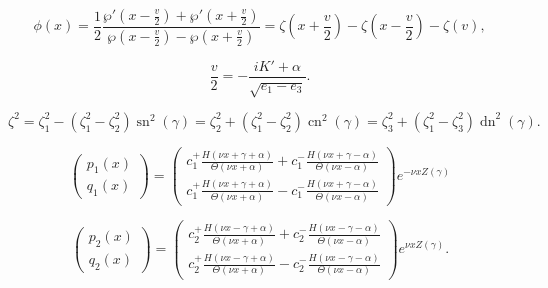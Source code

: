 \documentclass[10pt,a4paper]{amsart}
\DeclareMathOperator{\cn}{cn}
\DeclareMathOperator{\dn}{dn}
\DeclareMathOperator{\sn}{sn}
\begin{document}
\begin{equation}
\label{phinova}
\phi(x) = \frac{1}{2}\frac{\wp'(x-\frac{v}{2})+\wp'(x+\frac{v}{2})}{\wp(x-\frac{v}{2})-\wp(x + \frac{v}{2})} = \zeta\left(x+\frac{v}{2}\right)-\zeta\left(x-\frac{v}{2}\right)-\zeta(v),
\end{equation}

\begin{equation}
\label{v-alpha-correspondence}
\frac{v}{2} = -\frac{iK' + \alpha}{\sqrt{e_1-e_3}}.
\end{equation}

	\begin{equation}
	\label{Lame-disp}
	\zeta^2 = \zeta_1^2 - (\zeta_1^2 - \zeta_2^2) \sn^2(\gamma) = 
	\zeta_2^2 + (\zeta_1^2 - \zeta_2^2) \cn^2(\gamma) = 
	\zeta_3^2 + (\zeta_1^2 - \zeta_3^2) \dn^2(\gamma).
	\end{equation}

\begin{equation}
\label{Lame-sol-1}
\left( \begin{matrix} p_1(x) \\ q_1(x) \end{matrix} \right) = 
\left( \begin{matrix} 
c_1^+ \frac{ H(\nu x + \gamma + \alpha)}{\Theta(\nu x + \alpha)} + c_1^- \frac{H(\nu x + \gamma - \alpha)}{\Theta(\nu x - \alpha)} \\
c_1^+ \frac{ H(\nu x + \gamma + \alpha)}{\Theta(\nu x + \alpha)} - c_1^- \frac{H(\nu x + \gamma - \alpha)}{\Theta(\nu x - \alpha)} \end{matrix} 
\right)  e^{-\nu x Z(\gamma)}
\end{equation}

\begin{equation}
\label{Lame-sol-2}
\left( \begin{matrix} p_2(x) \\ q_2(x) \end{matrix} \right) = 
\left( \begin{matrix} c_2^+ \frac{ H(\nu x - \gamma + \alpha)}{\Theta(\nu x + \alpha)} + c_2^- \frac{H(\nu x - \gamma - \alpha)}{\Theta(\nu x - \alpha)} \\
c_2^+ \frac{ H(\nu x - \gamma + \alpha)}{\Theta(\nu x + \alpha)} - c_2^- \frac{H(\nu x - \gamma - \alpha)}{\Theta(\nu x - \alpha)}  \end{matrix} \right) 
e^{\nu x Z(\gamma)}. 
\end{equation}
\end{document}
